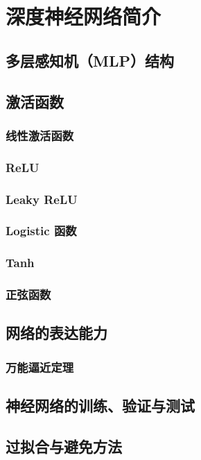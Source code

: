 \chapter{深度神经网络简介}

\section{多层感知机（MLP）结构}

\section{激活函数}
\subsection{线性激活函数}
\subsection{ReLU}
\subsection{Leaky ReLU}
\subsection{Logistic 函数}
\subsection{Tanh}
\subsection{正弦函数}

\section{网络的表达能力}
\subsection{万能逼近定理}

\section{神经网络的训练、验证与测试}

\section{过拟合与避免方法}
